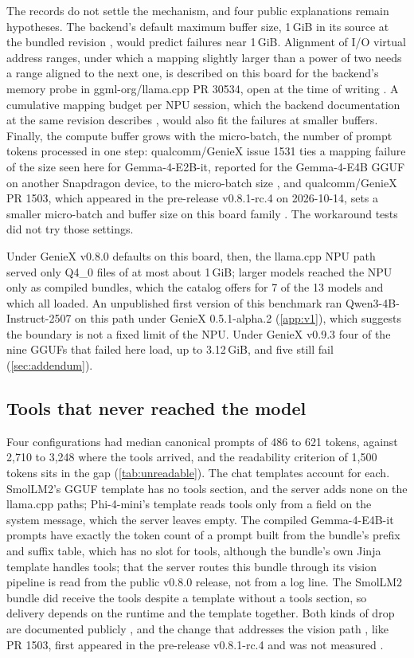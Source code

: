 \documentclass[11pt]{article}
\begin{document}
The records do not settle the mechanism, and four public explanations remain hypotheses. The backend's default maximum buffer size, 1\,GiB in its source at the bundled revision \citep{llamacpp}, would predict failures near 1\,GiB. Alignment of I/O virtual address ranges, under which a mapping slightly larger than a power of two needs a range aligned to the next one, is described on this board for the backend's memory probe in ggml-org/llama.cpp PR 30534, open at the time of writing \citep{llamacppPR30534}. A cumulative mapping budget per NPU session, which the backend documentation at the same revision describes \citep{llamacpp}, would also fit the failures at smaller buffers. Finally, the compute buffer grows with the micro-batch, the number of prompt tokens processed in one step: qualcomm/GenieX issue 1531 ties a mapping failure of the size seen here for Gemma-4-E2B-it, reported for the Gemma-4-E4B GGUF on another Snapdragon device, to the micro-batch size \citep{geniexIssue1531}, and qualcomm/GenieX PR 1503, which appeared in the pre-release v0.8.1-rc.4 on 2026-10-14, sets a smaller micro-batch and buffer size on this board family \citep{geniexPR1503}. The workaround tests did not try those settings.

Under GenieX v0.8.0 defaults on this board, then, the llama.cpp NPU path served only Q4\_0 files of at most about 1\,GiB; larger models reached the NPU only as compiled bundles, which the catalog offers for 7 of the 13 models and which all loaded. An unpublished first version of this benchmark ran Qwen3-4B-Instruct-2507 on this path under GenieX 0.5.1-alpha.2 (\cref{app:v1}), which suggests the boundary is not a fixed limit of the NPU. Under GenieX v0.9.3 four of the nine GGUFs that failed here load, up to 3.12\,GiB, and five still fail (\cref{sec:addendum}).

\subsection{Tools that never reached the model}\label{sec:tools}

Four configurations had median canonical prompts of 486 to 621 tokens, against 2,710 to 3,248 where the tools arrived, and the readability criterion of 1,500 tokens sits in the gap (\cref{tab:unreadable}). The chat templates account for each. SmolLM2's GGUF template has no tools section, and the server adds none on the llama.cpp paths; Phi-4-mini's template reads tools only from a field on the system message, which the server leaves empty. The compiled Gemma-4-E4B-it prompts have exactly the token count of a prompt built from the bundle's prefix and suffix table, which has no slot for tools, although the bundle's own Jinja template handles tools; that the server routes this bundle through its vision pipeline is read from the public v0.8.0 release, not from a log line. The SmolLM2 bundle did receive the tools despite a template without a tools section, so delivery depends on the runtime and the template together. Both kinds of drop are documented publicly \citep{llamacppIssue27129,geniexIssue1454}, and the change that addresses the vision path \citep{geniexPR1525}, like PR 1503, first appeared in the pre-release v0.8.1-rc.4 and was not measured \citep{geniex2026}.
\end{document}
